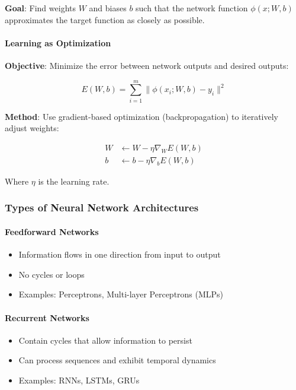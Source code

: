 \textbf{Goal}: Find weights $W$ and biases $b$ such that the network function $\phi(x; W, b)$ approximates the target function as closely as possible.

\paragraph{Learning as Optimization}

\textbf{Objective}: Minimize the error between network outputs and desired outputs:

\begin{equation}
E(W, b) = \sum_{i=1}^{m} \|\phi(x_i; W, b) - y_i\|^2
\end{equation}

\textbf{Method}: Use gradient-based optimization (backpropagation) to iteratively adjust weights:

\begin{align}
W &\leftarrow W - \eta \nabla_W E(W, b) \\
b &\leftarrow b - \eta \nabla_b E(W, b)
\end{align}

Where $\eta$ is the learning rate.

\subsubsection{Types of Neural Network Architectures}

\paragraph{Feedforward Networks}

\begin{itemize}
\item Information flows in one direction from input to output
\item No cycles or loops
\item Examples: Perceptrons, Multi-layer Perceptrons (MLPs)
\end{itemize}

\paragraph{Recurrent Networks}

\begin{itemize}
\item Contain cycles that allow information to persist
\item Can process sequences and exhibit temporal dynamics
\item Examples: RNNs, LSTMs, GRUs
\end{itemize}

